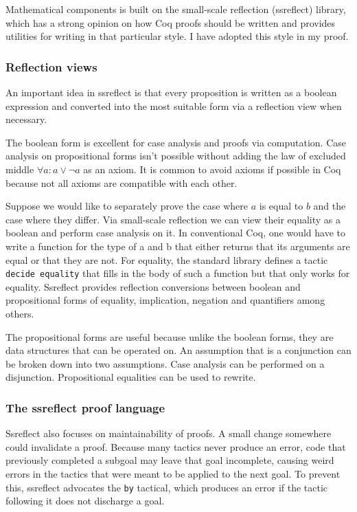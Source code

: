 \documentclass[english, 12pt, a4paper, sci, a-1b, online]{aaltothesis}
\newcommand\icoq[1]{\texttt{#1}}
\begin{document}
Mathematical components is built on the small-scale reflection (ssreflect) library, which has a strong opinion on how Coq proofs should be written and provides utilities for writing in that particular style. I have adopted this style in my proof.

\subsubsection{Reflection views}

An important idea in ssreflect is that every proposition is written as a boolean expression and converted into the most suitable form via a reflection view when necessary.~\cite{mathcompbook}

The boolean form is excellent for case analysis and proofs via computation. Case analysis on propositional forms isn't possible without adding the law of excluded middle $\forall a : a \lor \lnot a$ as an axiom. It is common to avoid axioms if possible in Coq because not all axioms are compatible with each other.

Suppose we would like to separately prove the case where $a$ is equal to $b$ and the case where they differ. Via small-scale reflection we can view their equality as a boolean and perform case analysis on it. In conventional Coq, one would have to write a function for the type of a and b that either returns that its arguments are equal or that they are not. For equality, the standard library defines a tactic \icoq{decide equality} that fills in the body of such a function but that only works for equality. Ssreflect provides reflection conversions between boolean and propositional forms of equality, implication, negation and quantifiers among others.

The propositional forms are useful because unlike the boolean forms, they are data structures that can be operated on. An assumption that is a conjunction can be broken down into two assumptions. Case analysis can be performed on a disjunction. Propositional equalities can be used to rewrite.

\subsubsection{The ssreflect proof language}

Ssreflect also focuses on maintainability of proofs. A small change somewhere could invalidate a proof. Because many tactics never produce an error, code that previously completed a subgoal may leave that goal incomplete, causing weird errors in the tactics that were meant to be applied to the next goal. To prevent this, ssreflect advocates the \icoq{by} tactical, which produces an error if the tactic following it does not discharge a goal.
\end{document}
